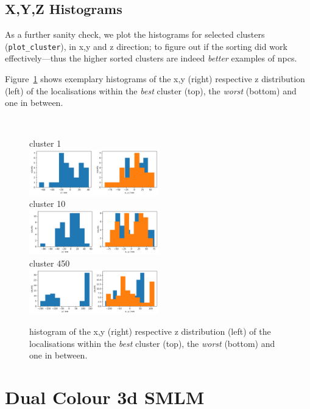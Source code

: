 \documentclass[11pt, a4paper, oneside, twocolumn]{report}
\renewcommand{\tt}{\texttt}
\newcommand{\e}{\emph}
\newcommand{\x}[1]{#1\index{#1}}
\begin{document}
\subsection{X,Y,Z Histograms}\label{s:r:xyzhist}

As a further sanity check, we plot the \x{histogram}s for selected
clusters (\tt{plot\_cluster}), in x,y and z direction; to figure out
if the sorting did work effectively---thus the higher sorted clusters
are indeed \e{better} examples of \gls{npc}s.

Figure~\ref{f:10_xyz_best_filtered_clusters} shows exemplary
histograms of the x,y (right) respective z distribution (left) of the
localisations within the \e{best} cluster (top), the \e{worst}
(bottom) and one in between.

\newpage
~ %
\begin{figure}[t!]
  \centering
  cluster 1\\
  \includegraphics[width=0.5\textwidth]{10_histograms_1.png}\\
  cluster 10\\
  \includegraphics[width=0.5\textwidth]{10_histograms_10.png}\\
  cluster 450\\
  \includegraphics[width=0.5\textwidth]{10_histograms_450.png}
  \caption{histogram of the x,y (right) respective z distribution
    (left) of the localisations within the \e{best} cluster (top), the
    \e{worst} (bottom) and one in between.}
  \label{f:10_xyz_best_filtered_clusters}
\end{figure}


\clearpage\section{Dual Colour 3d SMLM}\label{s:r:dcsim}
\end{document}
